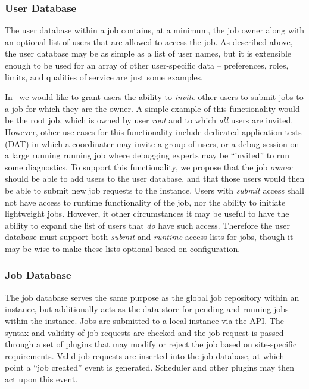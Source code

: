 \subsubsection{User Database}

The user database within a job contains, at a minimum, the job
owner along with an optional list of users that are allowed to
access the job. As described above, the user database may be
as simple as a list of user names, but it is extensible enough
to be used for an array of other user-specific data -- preferences,
roles, limits, and qualities of service are just some examples.

In \ngrm\ we would like to grant users the ability to \emph{invite}
other users to submit jobs to a job for which they are the owner.
A simple example of this functionality would be the root job,
which is owned by user \emph{root} and to which \emph{all} users
are invited. However, other use cases for this functionality
include dedicated application tests (DAT) in which a coordinater
may invite a group of users, or a debug session on a large running
running job where debugging experts may be ``invited'' to run some
diagnostics. To support this functionality, we propose that the job
\emph{owner} should be able to add users to the user database, and
that those users would then be able to submit new job requests to
the instance. Users with \emph{submit} access shall not have access
to runtime functionality of the job, nor the ability to initiate
lightweight jobs. However, it other circumstances it may be useful
to have the ability to expand the list of users that \emph{do}
have such access.  Therefore the user database must support both
\emph{submit} and \emph{runtime} access lists for jobs, though it
may be wise to make these lists optional based on configuration.


\subsubsection{Job Database}
\label{sec:jobdatabase}

The job database serves the same purpose as the global job repository
within an instance, but additionally acts as the data store for pending
and running jobs within the instance. Jobs are submitted to a local
instance via the API. The syntax and validity of job requests are checked
and the job request is passed through a set of plugins that may modify
or reject the job based on site-specific requirements. Valid job
requests are inserted into the job database, at which point a
``job created'' event is generated. Scheduler and other plugins may
then act upon this event.

